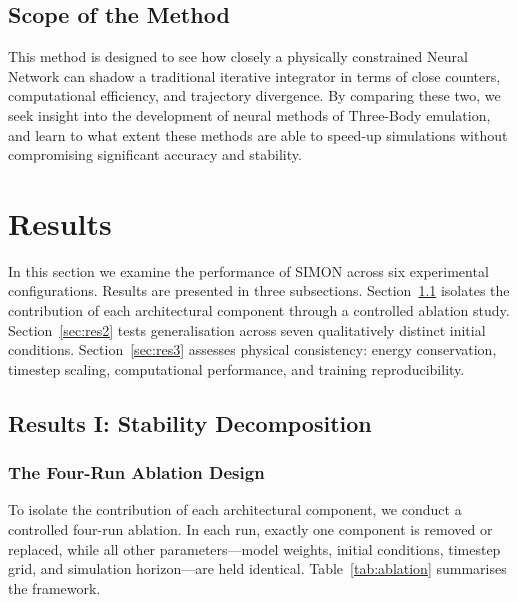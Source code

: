 \documentclass[12pt]{article}
\begin{document}
\subsection{Scope of the Method}
This method is designed to see how closely a physically constrained Neural Network can shadow a traditional iterative integrator in terms of close counters, computational efficiency, and trajectory divergence. By comparing these two, we seek insight into the development of neural methods of Three-Body emulation, and learn to what extent these methods are able to speed-up simulations without compromising significant accuracy and stability.

\section{Results}
\label{sec:results}

In this section we examine the performance of SIMON across six experimental configurations.
Results are presented in three subsections. Section~\ref{sec:res1} isolates the contribution
of each architectural component through a controlled ablation study.
Section~\ref{sec:res2} tests generalisation across seven qualitatively distinct initial
conditions. Section~\ref{sec:res3} assesses physical consistency: energy conservation,
timestep scaling, computational performance, and training reproducibility.

\subsection{Results I: Stability Decomposition}
\label{sec:res1}

\subsubsection{The Four-Run Ablation Design}
\label{sec:ablation_design}

To isolate the contribution of each architectural component, we conduct a controlled
four-run ablation. In each run, exactly one component is removed or replaced, while all
other parameters---model weights, initial conditions, timestep grid, and simulation
horizon---are held identical. Table~\ref{tab:ablation} summarises the framework.
\end{document}
